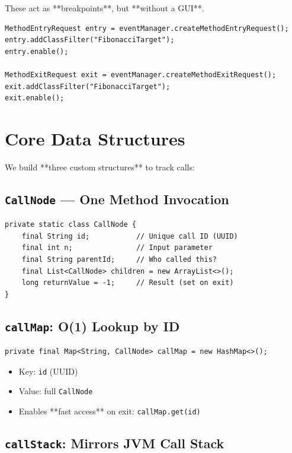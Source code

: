 \documentclass[11pt,a4paper]{article}
\begin{document}
    These act as **breakpoints**, but **without a GUI**.

    \begin{lstlisting}
MethodEntryRequest entry = eventManager.createMethodEntryRequest();
entry.addClassFilter("FibonacciTarget");
entry.enable();

MethodExitRequest exit = eventManager.createMethodExitRequest();
exit.addClassFilter("FibonacciTarget");
exit.enable();
    \end{lstlisting}

    \section{Core Data Structures}

    We build **three custom structures** to track calls:

    \subsection{\texttt{CallNode} — One Method Invocation}

    \begin{lstlisting}
private static class CallNode {
    final String id;           // Unique call ID (UUID)
    final int n;               // Input parameter
    final String parentId;     // Who called this?
    final List<CallNode> children = new ArrayList<>();
    long returnValue = -1;     // Result (set on exit)
}
    \end{lstlisting}

    \subsection{\texttt{callMap}: O(1) Lookup by ID}

    \begin{lstlisting}
private final Map<String, CallNode> callMap = new HashMap<>();
    \end{lstlisting}

    \begin{itemize}
        \item Key: \texttt{id} (UUID)
        \item Value: full \texttt{CallNode}
        \item Enables **fast access** on exit: \texttt{callMap.get(id)}
    \end{itemize}

    \subsection{\texttt{callStack}: Mirrors JVM Call Stack}
\end{document}
